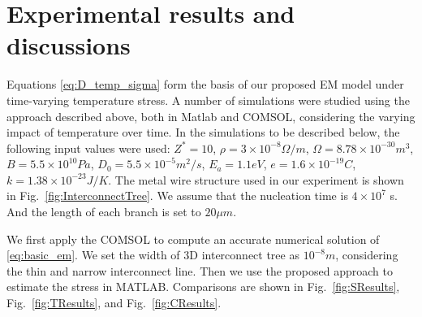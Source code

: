 \section{Experimental results and discussions}
\label{sec:experimental_results}

Equations \eqref{eq:D_temp_sigma} form the basis of our proposed EM model under time-varying temperature stress. A number of simulations were studied using the approach described above, both in Matlab and COMSOL, considering the varying impact of temperature over time.
In the simulations to be described below, the following input values were used: $Z^*=10$, $\rho=3\times10^{-8} \Omega/m$, $\Omega=8.78\times10^{-30}m^3$, $B=5.5\times10^{10} Pa$, $D_0=5.5\times10^{-5} m^2/s$, $E_a=1.1eV$, $e=1.6\times10^{-19}C$, $k=1.38\times10^{-23}J/K$. The metal wire structure used in our experiment is shown in Fig.~\ref{fig:InterconnectTree}. We assume that the nucleation time is $4\times10^7$ s. And the length of each branch is set to $20\mu m$.

We first apply the COMSOL to compute an accurate numerical solution of \eqref{eq:basic_em}. We set the width of 3D interconnect tree as $10^{-8}m$, considering the thin and narrow interconnect line. Then we use the proposed approach to estimate the stress in MATLAB. Comparisons are shown in Fig.~\ref{fig:SResults}, Fig.~\ref{fig:TResults}, and Fig.~\ref{fig:CResults}.
